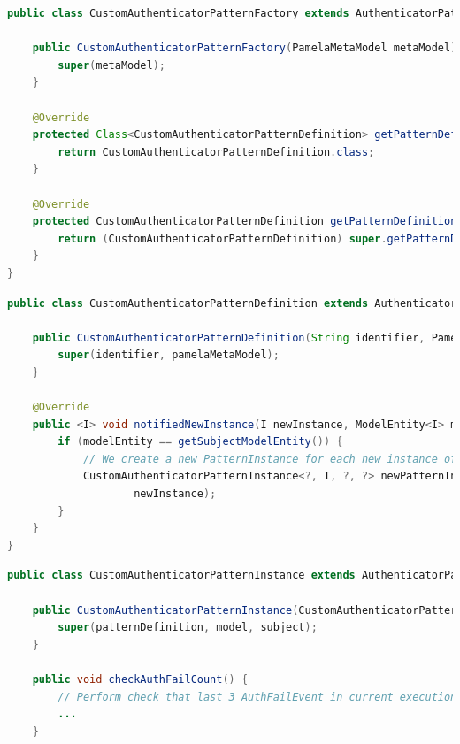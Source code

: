 \begin{lstlisting}[language=Java,basicstyle=\ttfamily\footnotesize, caption=Spécialisation de la classe \texttt{AuthenticatorPatternFactory.java},label=listing:CustomAuthenticatorPatternFactory]
public class CustomAuthenticatorPatternFactory extends AuthenticatorPatternFactory {

	public CustomAuthenticatorPatternFactory(PamelaMetaModel metaModel) {
		super(metaModel);
	}

	@Override
	protected Class<CustomAuthenticatorPatternDefinition> getPatternDefinitionClass() {
		return CustomAuthenticatorPatternDefinition.class;
	}

	@Override
	protected CustomAuthenticatorPatternDefinition getPatternDefinition(String patternId, boolean createWhenNonExistant) {
		return (CustomAuthenticatorPatternDefinition) super.getPatternDefinition(patternId, createWhenNonExistant);
	}
}
\end{lstlisting}

\begin{lstlisting}[language=Java,basicstyle=\ttfamily\footnotesize, caption=Spécialisation de la classe \texttt{AuthenticatorPatternDefinition.java},label=listing:CustomAuthenticatorPatternDefinition]
public class CustomAuthenticatorPatternDefinition extends AuthenticatorPatternDefinition {

	public CustomAuthenticatorPatternDefinition(String identifier, PamelaMetaModel pamelaMetaModel) {
		super(identifier, pamelaMetaModel);
	}

	@Override
	public <I> void notifiedNewInstance(I newInstance, ModelEntity<I> modelEntity, PamelaModel model) {
		if (modelEntity == getSubjectModelEntity()) {
			// We create a new PatternInstance for each new instance of subjectModelEntity
			CustomAuthenticatorPatternInstance<?, I, ?, ?> newPatternInstance = new CustomAuthenticatorPatternInstance(this, model,
					newInstance);
		}
	}
}
\end{lstlisting}

\begin{lstlisting}[language=Java,basicstyle=\ttfamily\footnotesize, caption=Spécialisation de la classe \texttt{AuthenticatorPatternInstance.java},label=listing:CustomAuthenticatorPatternInstance]
public class CustomAuthenticatorPatternInstance extends AuthenticatorPatternInstance<CustomAuthenticationProvider, SessionInfo, String, UsernamePasswordAuthenticationToken> {

	public CustomAuthenticatorPatternInstance(CustomAuthenticatorPatternDefinition patternDefinition, PamelaModel model, SessionInfo subject) {
		super(patternDefinition, model, subject);
	}

	public void checkAuthFailCount() {
		// Perform check that last 3 AuthFailEvent in current execution trace were not raised within allowed time limit
        ...
	}
\end{lstlisting}

